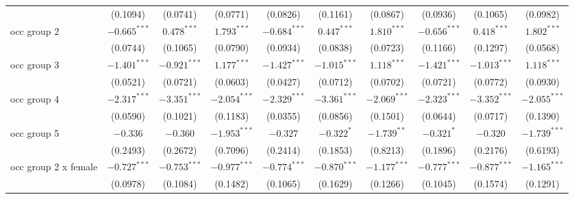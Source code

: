 \begin{tabular}{l|ccc|ccc|ccc|}
                           &                (0.1094) &        (0.0741) &        (0.0771) &                 (0.0826) &        (0.1161) &        (0.0867) &                 (0.0936) &        (0.1065) &        (0.0982) \\
occ group 2                &          $-0.665^{***}$ &   $0.478^{***}$ &   $1.793^{***}$ &           $-0.684^{***}$ &   $0.447^{***}$ &   $1.810^{***}$ &           $-0.656^{***}$ &   $0.418^{***}$ &   $1.802^{***}$ \\
                           &                (0.0744) &        (0.1065) &        (0.0790) &                 (0.0934) &        (0.0838) &        (0.0723) &                 (0.1166) &        (0.1297) &        (0.0568) \\
occ group 3                &          $-1.401^{***}$ &  $-0.921^{***}$ &   $1.177^{***}$ &           $-1.427^{***}$ &  $-1.015^{***}$ &   $1.118^{***}$ &           $-1.421^{***}$ &  $-1.013^{***}$ &   $1.118^{***}$ \\
                           &                (0.0521) &        (0.0721) &        (0.0603) &                 (0.0427) &        (0.0712) &        (0.0702) &                 (0.0721) &        (0.0772) &        (0.0930) \\
occ group 4                &          $-2.317^{***}$ &  $-3.351^{***}$ &  $-2.054^{***}$ &           $-2.329^{***}$ &  $-3.361^{***}$ &  $-2.069^{***}$ &           $-2.323^{***}$ &  $-3.352^{***}$ &  $-2.055^{***}$ \\
                           &                (0.0590) &        (0.1021) &        (0.1183) &                 (0.0355) &        (0.0856) &        (0.1501) &                 (0.0644) &        (0.0717) &        (0.1390) \\
occ group 5                &                $-0.336$ &        $-0.360$ &  $-1.953^{***}$ &                 $-0.327$ &      $-0.322^*$ &   $-1.739^{**}$ &               $-0.321^*$ &        $-0.320$ &  $-1.739^{***}$ \\
                           &                (0.2493) &        (0.2672) &        (0.7096) &                 (0.2414) &        (0.1853) &        (0.8213) &                 (0.1896) &        (0.2176) &        (0.6193) \\
occ group 2 x female       &          $-0.727^{***}$ &  $-0.753^{***}$ &  $-0.977^{***}$ &           $-0.774^{***}$ &  $-0.870^{***}$ &  $-1.177^{***}$ &           $-0.777^{***}$ &  $-0.877^{***}$ &  $-1.165^{***}$ \\
                           &                (0.0978) &        (0.1084) &        (0.1482) &                 (0.1065) &        (0.1629) &        (0.1266) &                 (0.1045) &        (0.1574) &        (0.1291) \\

\end{tabular}
